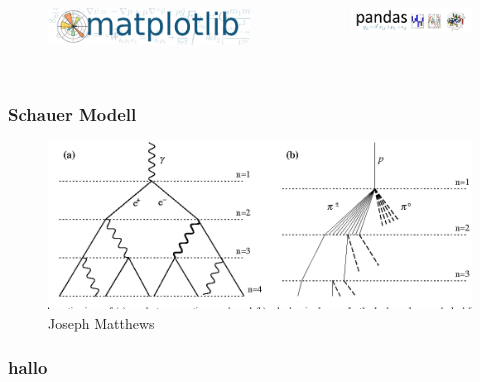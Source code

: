 \documentclass[aspectratio=1610, professionalfonts, 9pt]{beamer}
\begin{document}
\begin{frame}
\begin{columns}
      \vspace{0.6cm}

      \begin{figure}
        \includegraphics[width=\textwidth]{pictures/matplotlib.png}
      \end{figure}

      \vspace{0.6cm}

      \begin{figure}
        \includegraphics[width=\textwidth]{pictures/pandas.png}
      \end{figure}
    \end{columns}
  \end{frame}

  \section{}

  \begin{frame}[allowframebreaks]
    \printbibliography
  \end{frame}

  \begin{frame}
    \frametitle{Schauer Modell}
    \begin{figure}
      \includegraphics{pictures/Heitler.png}
      \caption{Joseph Matthews}
      \label{}
    \end{figure}
  \end{frame}

  \begin{frame}
    \frametitle{hallo}
  \end{frame}
\end{document}
